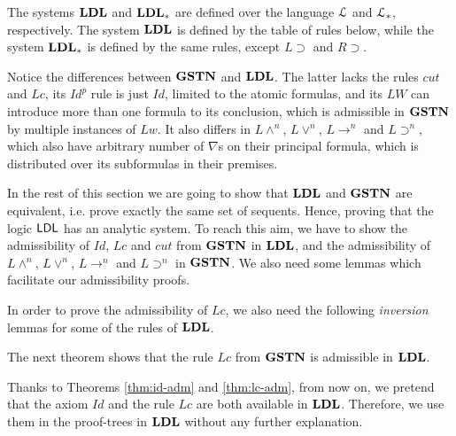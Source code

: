 The systems $\mathbf{LDL}$ and $\mathbf{LDL}_*$ are defined over the language $\mathcal{L}$ and $\mathcal{L}_*$, respectively. The system $\mathbf{LDL}$ is defined by the table of rules below, while the system $\mathbf{LDL}_*$ is defined by the same rules, except $L \supset$ and $R \supset$.


Notice the differences between $\mathbf{GSTN}$ and $\mathbf{LDL}$. The latter lacks the rules $cut$ and $Lc$, its $Id ^p$ rule is just $Id$, limited to the atomic formulas, and its $LW$ can introduce more than one formula to its conclusion, which is admissible in $\mathbf{GSTN}$ by multiple instances of $Lw$. It also differs in $L \wedge ^n$, $L \vee ^n$, $L \rightarrow ^n$ and $L \supset ^n$, which also have arbitrary number of $\nabla$s on their principal formula, which is distributed over its subformulas in their premises.

In the rest of this section we are going to show that $\mathbf{LDL}$ and $\mathbf{GSTN}$ are equivalent, i.e. prove exactly the same set of sequents. Hence, proving that the logic $\mathsf{LDL}$ has an analytic system. To reach this aim, we have to show the admissibility of $Id$, $Lc$ and $cut$ from $\mathbf{GSTN}$ in $\mathbf{LDL}$, and the admissibility of $L \wedge ^n$, $L \vee ^n$, $L \rightarrow ^n$ and $L \supset ^n$ in $\mathbf{GSTN}$. We also need some lemmas which facilitate our admissibility proofs.





In order to prove the admissibility of $Lc$, we also need the following \emph{inversion} lemmas for some of the rules of $\mathbf{LDL}$.


The next theorem shows that the rule $Lc$ from $\mathbf{GSTN}$ is admissible in $\mathbf{LDL}$.


\begin{nota}
  Thanks to Theorems \ref{thm:id-adm} and \ref{thm:lc-adm}, from now on, we pretend that the axiom $Id$ and the rule $Lc$ are both available in $\mathbf{LDL}$. Therefore, we use them in the proof-trees in $\mathbf{LDL}$ without any further explanation.
\end{nota}